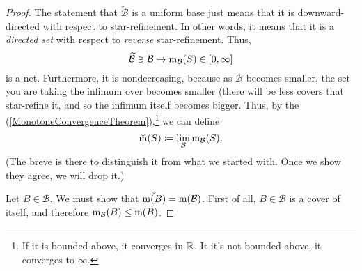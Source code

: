 \begin{thm}
\begin{proof}
The statement that $\widetilde{\mathcal{B}}$ is a uniform base just means that it is downward-directed with respect to star-refinement.  In other words, it means that it is a \emph{directed set} with respect to \emph{reverse} star-refinement.  Thus,
\begin{equation}
\widetilde{\mathcal{B}}\ni \mathcal{B}\mapsto \mathrm{m} _{\mathcal{B}}(S)\in [0,\infty ]
\end{equation}
is a net.  Furthermore, it is nondecreasing, because as $\mathcal{B}$ becomes smaller, the set you are taking the infimum over becomes smaller (there will be less covers that star-refine it, and so the infimum itself becomes bigger.  Thus, by the  (\cref{MonotoneConvergenceTheorem}),\footnote{If it is bounded above, it converges in $\mathbb{R}$.  It it's not bounded above, it converges to $\infty$.}  we can define
\begin{equation}
\breve{\mathrm{m}}(S)\coloneqq \lim _{\mathcal{B}}\mathrm{m} _{\mathcal{B}}(S).
\end{equation}
(The breve is there to distinguish it from what we started with.  Once we show they agree, we will drop it.)

Let $B\in \mathcal{B}$.  We must show that $\breve{\mathrm{m} (B)}=\mathrm{m}(\mathcal{B})$.  First of all, $B\in \mathcal{B}$ is a cover of itself, and therefore $\mathrm{m} _{\mathcal{B}}(B)\leq \mathrm{m} (B)$.
\end{proof}
\end{thm}

